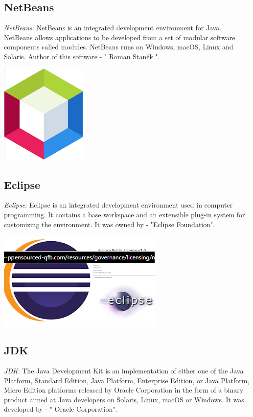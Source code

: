 \documentclass[paper = A5, headinclude, parskip = full, oneside, font = 11 pt]{report}
\begin{document}
\color{red}
\subsection{NetBeans}
\color{black}
\textit{NetBeans}: NetBeans is an integrated development environment for Java. NetBeans allows applications to be developed from a set of modular software components called modules. NetBeans runs on Windows, macOS, Linux and Solaris. Author of this software - " Roman Staněk ".

\begin{center}
 \includegraphics[width = 140 pt]{NetBeans.png}
\end{center}

\color{red}
\subsection{Eclipse}
\color{black}
\textit{Eclipse}: Eclipse is an integrated development environment used in computer programming. It contains a base workspace and an extensible plug-in system for customizing the environment. It was owned by - "Eclipse Foundation".

\begin{center}
 \includegraphics[width = 140 pt]{Eclipse.png}
\end{center}

\color{red}
\subsection{JDK}
\color{black}
\textit{JDK}: The Java Development Kit is an implementation of either one of the Java Platform, Standard Edition, Java Platform, Enterprise Edition, or Java Platform, Micro Edition platforms released by Oracle Corporation in the form of a binary product aimed at Java developers on Solaris, Linux, macOS or Windows. It was developed by - " Oracle Corporation".
\end{document}
